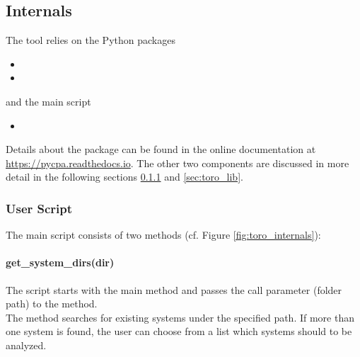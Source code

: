 \subsection{Internals}

The tool \Tool relies on the Python packages
\begin{itemize}[itemsep=0pt]
	\item {}
	\item {}
\end{itemize}
and the main script
\begin{itemize}[itemsep=0pt]
	\item {}
\end{itemize}
Details about the  package can be found in the online documentation at \url{https://pycpa.readthedocs.io}.
The other two components are discussed in more detail in the following sections \ref{sec:script} and \ref{sec:toro_lib}.
    
\subsubsection{User Script}
\label{sec:script}
The main script  consists of two methods (cf. Figure \ref{fig:toro_internals}):

\paragraph{get\_system\_dirs(dir)}
The script  starts with the main method and passes the call parameter (folder path) to the  method. \\
The method  searches for existing systems under the specified path. 
If more than one system is found, the user can choose from a list which systems should to be analyzed. 

